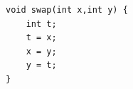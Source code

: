 \documentclass{jarticle}
\begin{document}
\begin{Verbatim}
void swap(int x,int y) {
    int t;
    t = x;
    x = y;
    y = t;
}
\end{Verbatim}
\end{document}
